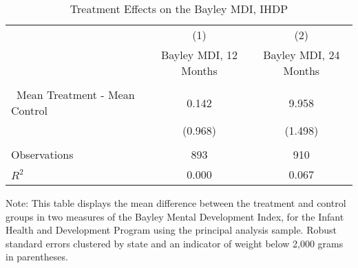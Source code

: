 \begin{table}[H] 
\begin{threeparttable}
\caption{Treatment Effects on the Bayley MDI, IHDP}
\label{table:ihdp}
\centering 
\begin{tabular}{lcc} \hline \hline
 & (1) & (2) \\
 & Bayley MDI, 12 Months & Bayley MDI, 24 Months \\ \hline
 &  &  \\\
Mean Treatment - Mean Control & 0.142 & 9.958 \\
 & (0.968) & (1.498) \\
 &  &  \\ \hline
Observations & 893 & 910 \\
$R^2$ & 0.000 & 0.067 \\ \hline \hline  
\end{tabular}
\begin{tablenotes}
\footnotesize
\item Note: This table displays the mean difference between the treatment and control groups in two measures of the Bayley Mental Development Index, for the Infant Health and Development Program using the principal analysis sample. Robust standard errors clustered by state and an indicator of weight below 2,000 grams in parentheses.
\end{tablenotes}
\end{threeparttable}
\end{table}
